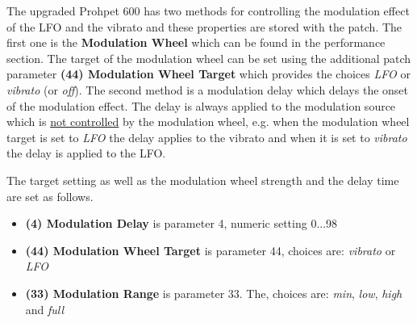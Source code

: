The upgraded Prohpet 600 has two methods for controlling the modulation effect of the LFO and the vibrato and these properties are  stored with the patch. The first one is the \textbf{Modulation Wheel} which can be found in the performance section. The target of the modulation wheel can be set using the additional patch parameter \textbf{(44) Modulation Wheel Target} which provides the choices \textit{LFO} or \textit{vibrato} (or \textit{off}). The second method is a modulation delay which delays the onset of the modulation effect. The delay is always applied to the modulation source which is \underline{not controlled} by the modulation wheel, e.g. when the modulation wheel target is set to \textit{LFO} the delay applies to the vibrato and when it is set to \textit{vibrato} the delay is applied to the LFO.

The target setting as well as the modulation wheel strength and the delay time are set as follows. 
\begin{itemize}
  \item \textbf{(4) Modulation Delay} is parameter 4, numeric setting 0...98
  \item \textbf{(44) Modulation Wheel Target} is parameter 44, choices are: \textit{vibrato} or \textit{LFO}
  \item \textbf{(33) Modulation Range} is parameter 33. The, choices are: \textit{min}, \textit{low}, \textit{high} and \textit{full}
\end{itemize} 
